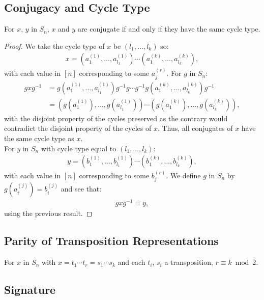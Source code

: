 \subsection{Conjugacy and Cycle Type} \label{4.3}

For $x$, $y$ in $S_n$, $x$ and $y$ are conjugate if and only if
they have the same cycle type.

\begin{proof}
    We take the cycle type of $x$ be $(l_1, \ldots, l_k)$ so: \begin{align*}
        x = (a_1^{(1)}, \ldots, a_{l_1}^{(1)}) \cdots (a_1^{(k)}, \ldots, a_{l_k}^{(k)}),
    \end{align*} with each value in $[n]$ corresponding to some $a_j^{(r)}$.
    For $g$ in $S_n$: \begin{align*}
        gxg^{-1} 
        &= g(a_1^{(1)}, \ldots, a_{l_1}^{(1)})g^{-1}g \cdots g^{-1}g(a_1^{(k)}, \ldots, a_{l_k}^{(k)})g^{-1} \\
        &= (g(a_1^{(1)}), \ldots, g(a_{l_1}^{(1)})) \cdots (g(a_1^{(k)}), \ldots, g(a_{l_k}^{(k)})),
    \end{align*} with the disjoint property of the cycles preserved as the
    contrary would contradict the disjoint property of the cycles of $x$.
    Thus, all conjugates of $x$ have the same cycle type as $x$.
    \\[\baselineskip]
    For $y$ in $S_n$ with cycle type equal to $(l_1, \ldots, l_k)$: \begin{align*}
        y = (b_1^{(1)}, \ldots, b_{l_1}^{(1)}) \cdots (b_1^{(k)}, \ldots, b_{l_k}^{(k)}),
    \end{align*} with each value in $[n]$ corresponding to some $b_j^{(r)}$.
    We define $g$ in $S_n$ by $g(a_i^{(j)}) = b_i^{(j)}$ and see that: \begin{align*}
        gxg^{-1} = y,
    \end{align*} using the previous result.
\end{proof}

\subsection{Parity of Transposition Representations}

For $x$ in $S_n$ with $x = t_1 \cdots t_r = s_1 \cdots s_k$ and
each $t_i$, $s_i$ a transposition, $r \equiv k \bmod 2$.

\subsection{Signature}

